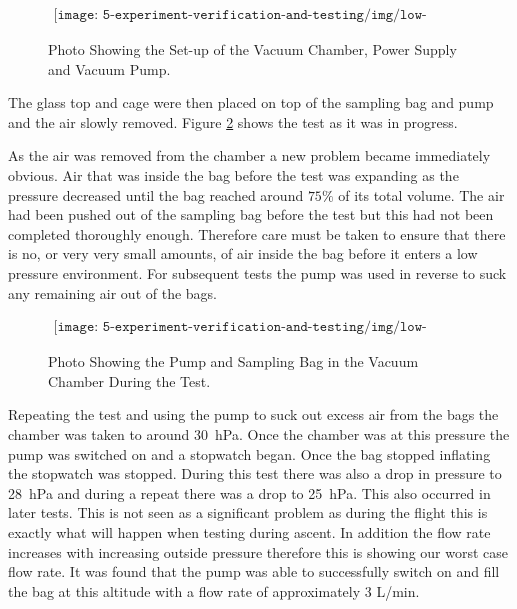 \begin{figure}[H]
    \begin{align*}
        \texttt{[image: 5-experiment-verification-and-testing/img/low-pressure-set-up.png]}
    \end{align*}
    \caption {Photo Showing the Set-up of the Vacuum Chamber, Power Supply and Vacuum Pump.}\label{fig:pump-low-pressure-set-up}
\end{figure}

The glass top and cage were then placed on top of the sampling bag and pump and the air slowly removed. Figure \ref{fig:pump-low-pressure-progress} shows the test as it was in progress. 

As the air was removed from the chamber a new problem became immediately obvious. Air that was inside the bag before the test was expanding as the pressure decreased until the bag reached around $75\%$ of its total volume. The air had been pushed out of the sampling bag before the test but this had not been completed thoroughly enough. Therefore care must be taken to ensure that there is no, or very very small amounts, of air inside the bag before it enters a low pressure environment. For subsequent tests the pump was used in reverse to suck any remaining air out of the bags. 

\begin{figure}[H]
    \begin{align*}
        \texttt{[image: 5-experiment-verification-and-testing/img/low-pressure-in-progress.png]}
    \end{align*}
    \caption {Photo Showing the Pump and Sampling Bag in the Vacuum Chamber During the Test.} \label{fig:pump-low-pressure-progress}
\end{figure}

Repeating the test and using the pump to suck out excess air from the bags the chamber was taken to around \SI{30}{\hecto\pascal}. Once the chamber was at this pressure the pump was switched on and a stopwatch began. Once the bag stopped inflating the stopwatch was stopped. During this test there was also a drop in pressure to \SI{28}{\hecto\pascal} and during a repeat there was a drop to \SI{25}{\hecto\pascal}. This also occurred in later tests. This is not seen as a significant problem as during the flight this is exactly what will happen when testing during ascent. In addition the flow rate increases with increasing outside pressure therefore this is showing our worst case flow rate. It was found that the pump was able to successfully switch on and fill the bag at this altitude with a flow rate of approximately 3 L/min. 

